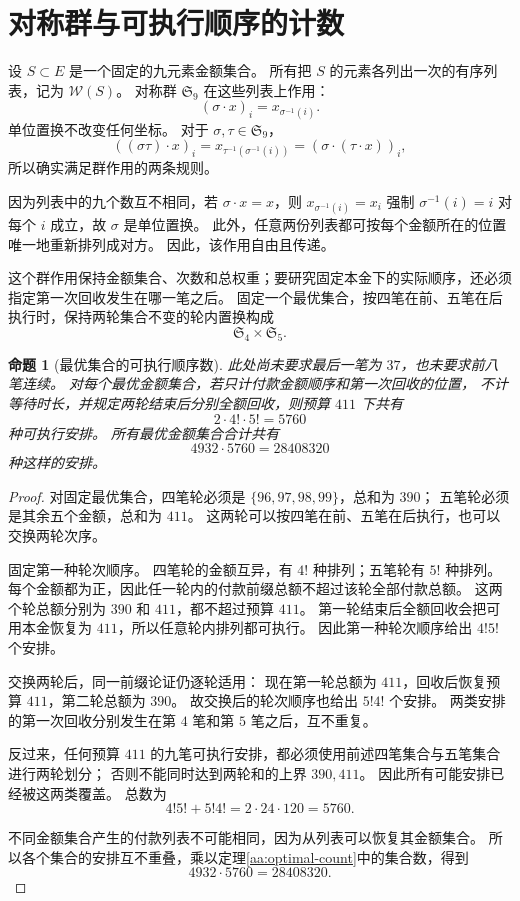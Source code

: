 \documentclass[UTF8,a4paper]{ctexbook}
\newtheorem{proposition}[theorem]{命题}
\theoremstyle{definition}
\numberwithin{equation}{chapter}
\newcommand{\1}{\mathbf{1}}
\begin{document}
\section{对称群与可执行顺序的计数}

设 \(S\subset E\) 是一个固定的九元素金额集合。
所有把 \(S\) 的元素各列出一次的有序列表，记为 \(\mathcal W(S)\)。
对称群 \(\mathfrak S_9\) 在这些列表上作用：
\[
(\sigma\cdot x)_i=x_{\sigma^{-1}(i)}.
\]
单位置换不改变任何坐标。
对于 \(\sigma,\tau\in\mathfrak S_9\)，
\[
((\sigma\tau)\cdot x)_i
=x_{\tau^{-1}(\sigma^{-1}(i))}
=(\sigma\cdot(\tau\cdot x))_i,
\]
所以确实满足群作用的两条规则。

因为列表中的九个数互不相同，若 \(\sigma\cdot x=x\)，则
\(x_{\sigma^{-1}(i)}=x_i\) 强制 \(\sigma^{-1}(i)=i\) 对每个 \(i\) 成立，故 \(\sigma\) 是单位置换。
此外，任意两份列表都可按每个金额所在的位置唯一地重新排列成对方。
因此，该作用自由且传递。

这个群作用保持金额集合、次数和总权重；要研究固定本金下的实际顺序，还必须指定第一次回收发生在哪一笔之后。
固定一个最优集合，按四笔在前、五笔在后执行时，保持两轮集合不变的轮内置换构成
\[
\mathfrak S_4\times\mathfrak S_5.
\]

\begin{proposition}[最优集合的可执行顺序数]\label{aa:order-count}
此处尚未要求最后一笔为 \(37\)，也未要求前八笔连续。
对每个最优金额集合，若只计付款金额顺序和第一次回收的位置，
不计等待时长，并规定两轮结束后分别全额回收，则预算 \(411\) 下共有
\[
2\cdot4!\cdot5!=5760
\]
种可执行安排。
所有最优金额集合合计共有
\[
4932\cdot5760=28408320
\]
种这样的安排。
\end{proposition}

\begin{proof}
对固定最优集合，四笔轮必须是 \(\{96,97,98,99\}\)，总和为 \(390\)；
五笔轮必须是其余五个金额，总和为 \(411\)。
这两轮可以按四笔在前、五笔在后执行，也可以交换两轮次序。

固定第一种轮次顺序。
四笔轮的金额互异，有 \(4!\) 种排列；五笔轮有 \(5!\) 种排列。
每个金额都为正，因此任一轮内的付款前缀总额不超过该轮全部付款总额。
这两个轮总额分别为 \(390\) 和 \(411\)，都不超过预算 \(411\)。
第一轮结束后全额回收会把可用本金恢复为 \(411\)，所以任意轮内排列都可执行。
因此第一种轮次顺序给出 \(4!5!\) 个安排。

交换两轮后，同一前缀论证仍逐轮适用：
现在第一轮总额为 \(411\)，回收后恢复预算 \(411\)，第二轮总额为 \(390\)。
故交换后的轮次顺序也给出 \(5!4!\) 个安排。
两类安排的第一次回收分别发生在第 \(4\) 笔和第 \(5\) 笔之后，互不重复。

反过来，任何预算 \(411\) 的九笔可执行安排，都必须使用前述四笔集合与五笔集合进行两轮划分；
否则不能同时达到两轮和的上界 \(390,411\)。
因此所有可能安排已经被这两类覆盖。
总数为
\[
4!5!+5!4!=2\cdot24\cdot120=5760.
\]

不同金额集合产生的付款列表不可能相同，因为从列表可以恢复其金额集合。
所以各个集合的安排互不重叠，乘以定理\ref{aa:optimal-count}中的集合数，得到
\[
4932\cdot5760=28408320.
\]
\end{proof}
\end{document}

